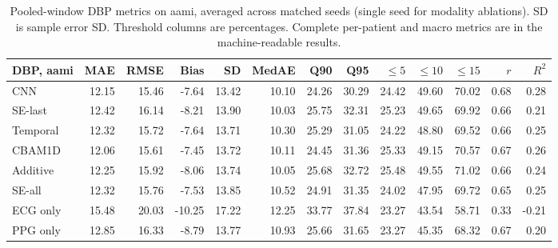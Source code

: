 \documentclass[11pt]{article}
\begin{document}
\begin{table}[t]\centering\scriptsize\setlength{\tabcolsep}{3pt}
\begin{tabular}{lrrrrrrrrrrrr}\toprule
DBP, aami & MAE & RMSE & Bias & SD & MedAE & Q90 & Q95 & $\leq5$ & $\leq10$ & $\leq15$ & $r$ & $R^2$\\\midrule
CNN & 12.15 & 15.46 & -7.64 & 13.42 & 10.10 & 24.26 & 30.29 & 24.42 & 49.60 & 70.02 & 0.68 & 0.28\\
SE-last & 12.42 & 16.14 & -8.21 & 13.90 & 10.03 & 25.75 & 32.31 & 25.23 & 49.65 & 69.92 & 0.66 & 0.21\\
Temporal & 12.32 & 15.72 & -7.64 & 13.71 & 10.30 & 25.29 & 31.05 & 24.22 & 48.80 & 69.52 & 0.66 & 0.25\\
CBAM1D & 12.06 & 15.61 & -7.45 & 13.72 & 10.11 & 24.45 & 31.36 & 25.33 & 49.15 & 70.57 & 0.67 & 0.26\\
Additive & 12.25 & 15.92 & -8.06 & 13.74 & 10.05 & 25.68 & 32.72 & 25.48 & 49.55 & 71.02 & 0.66 & 0.24\\
SE-all & 12.32 & 15.76 & -7.53 & 13.85 & 10.52 & 24.91 & 31.35 & 24.02 & 47.95 & 69.72 & 0.65 & 0.25\\
ECG only & 15.48 & 20.03 & -10.25 & 17.22 & 12.25 & 33.77 & 37.84 & 23.27 & 43.54 & 58.71 & 0.33 & -0.21\\
PPG only & 12.85 & 16.33 & -8.79 & 13.77 & 10.93 & 25.66 & 31.65 & 23.27 & 45.35 & 68.32 & 0.67 & 0.20\\
\bottomrule\end{tabular}
\caption{Pooled-window DBP metrics on aami, averaged across matched seeds (single seed for modality ablations). SD is sample error SD. Threshold columns are percentages. Complete per-patient and macro metrics are in the machine-readable results.}\end{table}
\end{document}
